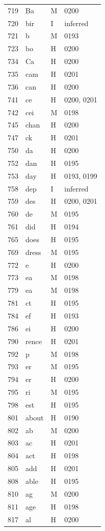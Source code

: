 \begin{longtable}{@{}rlll@{}}
719 & Ba & M & 0200 \\
720 & bir & I & inferred \\
721 & b & M & 0193 \\
723 & bo & H & 0200 \\
734 & Ca & H & 0200 \\
735 & cam & H & 0201 \\
736 & can & H & 0200 \\
741 & ce & H & 0200, 0201 \\
742 & cei & M & 0198 \\
745 & chan & H & 0200 \\
747 & ck & H & 0201 \\
750 & da & H & 0200 \\
752 & dan & H & 0195 \\
753 & day & H & 0193, 0199 \\
758 & dep & I & inferred \\
759 & des & H & 0200, 0201 \\
760 & de & M & 0195 \\
761 & did & H & 0194 \\
765 & does & H & 0195 \\
769 & dress & M & 0195 \\
772 & e & H & 0200 \\
773 & ea & M & 0198 \\
779 & ea & M & 0198 \\
781 & ct & H & 0195 \\
784 & ef & H & 0193 \\
786 & ei & H & 0200 \\
790 & rence & H & 0201 \\
792 & p & M & 0198 \\
793 & er & M & 0195 \\
794 & er & H & 0200 \\
795 & ri & M & 0195 \\
798 & est & H & 0195 \\
801 & about & H & 0190 \\
802 & ab & M & 0200 \\
803 & ac & H & 0201 \\
804 & act & H & 0198 \\
805 & add & H & 0201 \\
808 & able & H & 0195 \\
810 & ag & M & 0200 \\
811 & age & H & 0198 \\
817 & al & H & 0200 \\

\end{longtable}
